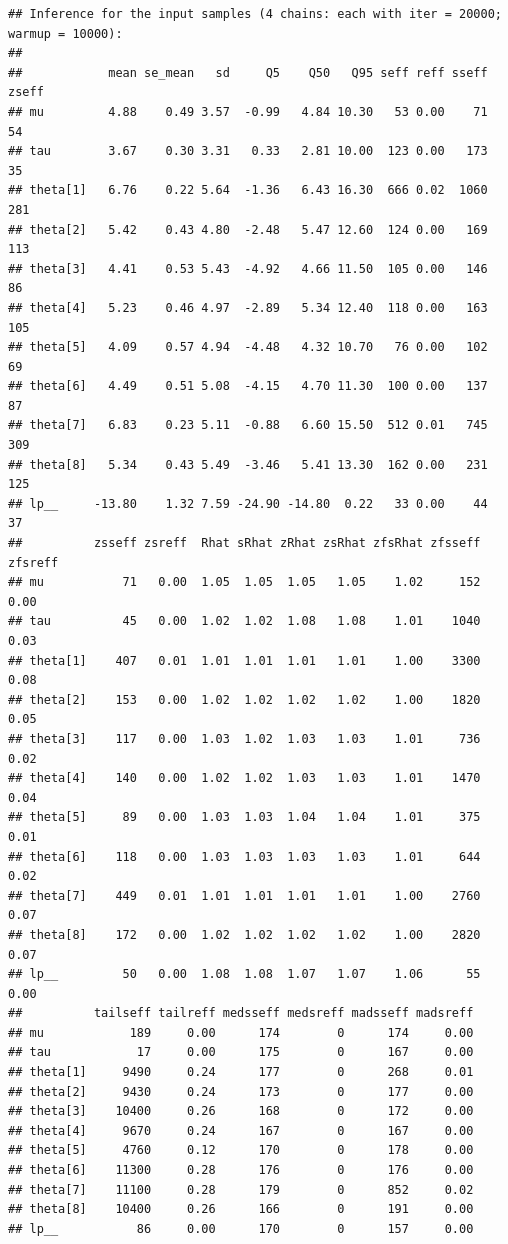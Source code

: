 \documentclass[american,]{article}
\begin{document}
\begin{verbatim}
## Inference for the input samples (4 chains: each with iter = 20000; warmup = 10000):
## 
##            mean se_mean   sd     Q5    Q50   Q95 seff reff sseff zseff
## mu         4.88    0.49 3.57  -0.99   4.84 10.30   53 0.00    71    54
## tau        3.67    0.30 3.31   0.33   2.81 10.00  123 0.00   173    35
## theta[1]   6.76    0.22 5.64  -1.36   6.43 16.30  666 0.02  1060   281
## theta[2]   5.42    0.43 4.80  -2.48   5.47 12.60  124 0.00   169   113
## theta[3]   4.41    0.53 5.43  -4.92   4.66 11.50  105 0.00   146    86
## theta[4]   5.23    0.46 4.97  -2.89   5.34 12.40  118 0.00   163   105
## theta[5]   4.09    0.57 4.94  -4.48   4.32 10.70   76 0.00   102    69
## theta[6]   4.49    0.51 5.08  -4.15   4.70 11.30  100 0.00   137    87
## theta[7]   6.83    0.23 5.11  -0.88   6.60 15.50  512 0.01   745   309
## theta[8]   5.34    0.43 5.49  -3.46   5.41 13.30  162 0.00   231   125
## lp__     -13.80    1.32 7.59 -24.90 -14.80  0.22   33 0.00    44    37
##          zsseff zsreff  Rhat sRhat zRhat zsRhat zfsRhat zfsseff zfsreff
## mu           71   0.00  1.05  1.05  1.05   1.05    1.02     152    0.00
## tau          45   0.00  1.02  1.02  1.08   1.08    1.01    1040    0.03
## theta[1]    407   0.01  1.01  1.01  1.01   1.01    1.00    3300    0.08
## theta[2]    153   0.00  1.02  1.02  1.02   1.02    1.00    1820    0.05
## theta[3]    117   0.00  1.03  1.02  1.03   1.03    1.01     736    0.02
## theta[4]    140   0.00  1.02  1.02  1.03   1.03    1.01    1470    0.04
## theta[5]     89   0.00  1.03  1.03  1.04   1.04    1.01     375    0.01
## theta[6]    118   0.00  1.03  1.03  1.03   1.03    1.01     644    0.02
## theta[7]    449   0.01  1.01  1.01  1.01   1.01    1.00    2760    0.07
## theta[8]    172   0.00  1.02  1.02  1.02   1.02    1.00    2820    0.07
## lp__         50   0.00  1.08  1.08  1.07   1.07    1.06      55    0.00
##          tailseff tailreff medsseff medsreff madsseff madsreff
## mu            189     0.00      174        0      174     0.00
## tau            17     0.00      175        0      167     0.00
## theta[1]     9490     0.24      177        0      268     0.01
## theta[2]     9430     0.24      173        0      177     0.00
## theta[3]    10400     0.26      168        0      172     0.00
## theta[4]     9670     0.24      167        0      167     0.00
## theta[5]     4760     0.12      170        0      178     0.00
## theta[6]    11300     0.28      176        0      176     0.00
## theta[7]    11100     0.28      179        0      852     0.02
## theta[8]    10400     0.26      166        0      191     0.00
## lp__           86     0.00      170        0      157     0.00
\end{verbatim}
\end{document}
